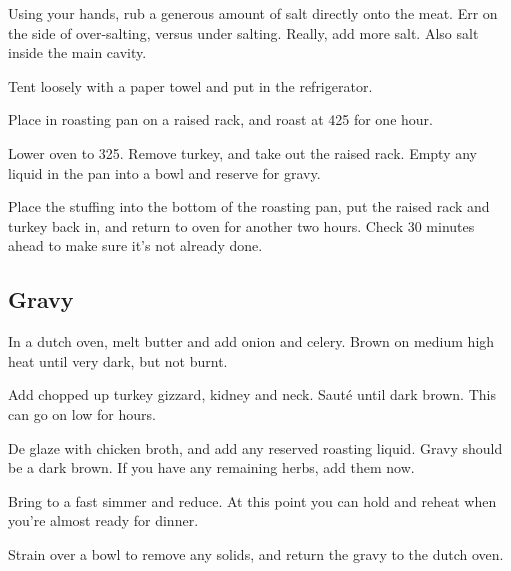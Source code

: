 \begin{recipe}
Using your hands, rub a generous amount of salt directly onto the meat.
Err on the side of over-salting, versus under salting. Really, add more salt.
Also salt inside the main cavity.

Tent loosely with a paper towel and put in the refrigerator.

Place in roasting pan on a raised rack, and roast at 425\degree{} for one hour.

Lower oven to 325\degree{}. Remove turkey, and take out the raised rack.
Empty any liquid in the pan into a bowl and reserve for gravy.

Place the stuffing into the bottom of the roasting pan, put the raised rack
and turkey back in, and return to oven for another two hours. Check 30 minutes
ahead to make sure it's not already done.

\newpage
\subsection{Gravy}



In a dutch oven, melt butter and add onion and celery. Brown on medium high heat until very dark, but not burnt.

Add chopped up turkey gizzard, kidney and neck. Sauté until dark brown. This can go on low for hours.


De glaze with chicken broth, and add any reserved roasting liquid. Gravy should be a dark brown. If you have any remaining herbs, add them now.

Bring to a fast simmer and reduce. At this point you can hold and reheat when you're almost ready for dinner.

Strain over a bowl to remove any solids, and return the gravy to the dutch oven.



\end{recipe}
